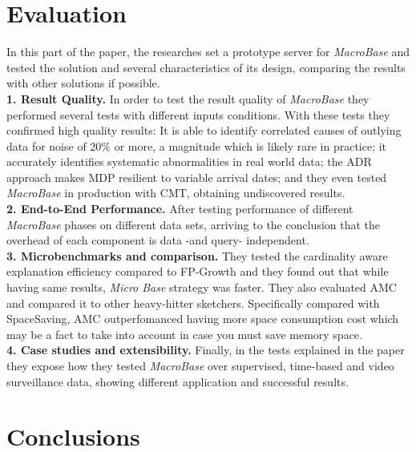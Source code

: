 \documentclass[11pt, titlepage]{article}
\begin{document}
	\section{Evaluation}
	\begin{flushleft}
		In this part of the paper, the researches set a prototype server for \textit{MacroBase} and tested the solution and several characteristics of its design, comparing the results with other solutions if possible.
		\\\textbf{1. Result Quality.} In order to test the result quality of \textit{MacroBase} they performed several tests with different inputs conditions. With these tests they confirmed high quality results: It is able to identify correlated causes of outlying data for noise of 20\% or more, a magnitude which is likely rare in practice; it accurately identifies systematic abnormalities in real world data; the ADR approach makes MDP resilient to variable arrival dates; and they even tested \textit{MacroBase} in production with CMT, obtaining undiscovered results.
		\\\textbf{2. End-to-End Performance.} After testing performance of different \textit{MacroBase} phases on different data sets, arriving to the conclusion that the overhead of each component is data -and query- independent.
		\\\textbf{3. Microbenchmarks and comparison.} They tested the cardinality aware explanation efficiency compared to FP-Growth and they found out that while having same results, \textit{Micro Base} strategy was faster. They also evaluated AMC and compared it to other heavy-hitter sketchers. Specifically compared with SpaceSaving, AMC outperfomanced having more space consumption cost which may be a fact to take into account in case you must save memory space.
		\\\textbf{4. Case studies and extensibility.} Finally, in the tests explained in the paper they expose how they tested \textit{MacroBase} over supervised, time-based and video surveillance data, showing different application and successful results.
	\end{flushleft}
	\section{Conclusions}
	\begin{flushleft}
		
	\end{flushleft}
\end{document}
